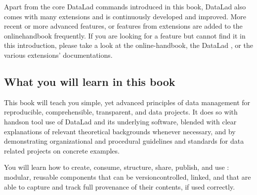 \sphinxAtStartPar
Apart from the core DataLad commands introduced in this book, DataLad also comes with many extensions and is continuously developed and improved.
More recent or more advanced features, or features from extensions are added to the online\sphinxhyphen{}handbook frequently.
If you are looking for a feature but cannot find it in this introduction, please take a look at the online-handbook, the DataLad , or the various extensions’ documentations.


\subsection{What you will learn in this book}
\label{\detokenize{intro/narrative:what-you-will-learn-in-this-book}}
\sphinxAtStartPar
This book will teach you simple, yet advanced principles of data
management for reproducible, comprehensible, transparent, and
 data
projects. It does so with hands\sphinxhyphen{}on tool use of DataLad and its
underlying software, blended with clear explanations of relevant
theoretical backgrounds whenever necessary, and by demonstrating
organizational and procedural guidelines and standards for data
related projects on concrete examples.

\sphinxAtStartPar
You will learn how to create, consume, structure, share, publish, and use
: modular, reusable components that can be version\sphinxhyphen{}controlled,
linked, and that are able to capture and track full provenance of their
contents, if used correctly.

